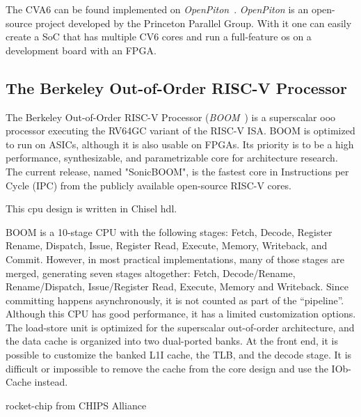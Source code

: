 The CVA6 can be found implemented on \textit{OpenPiton}~\cite{Balkind:2016:OOS:2872362.2872414}. \textit{OpenPiton} is an open-source project developed by the Princeton Parallel Group. With it one can easily create a SoC that has multiple CV6 cores and run a full-feature \acrfull{os} on a development board with an FPGA.

\subsection{The Berkeley Out-of-Order RISC-V Processor}
The Berkeley Out-of-Order RISC-V Processor (\textit{BOOM}~\cite{zhaosonicboom}) is a superscalar \acrfull{ooo} processor executing the RV64GC variant of the RISC-V ISA. BOOM is optimized to run on ASICs, although it is also usable on FPGAs. Its priority is to be a high performance, synthesizable, and parametrizable core for architecture research. The current release, named "SonicBOOM", is the fastest core in Instructions per Cycle (IPC) from the publicly available open-source RISC-V cores.

This \acrshort{cpu} design is written in Chisel \acrfull{hdl}.

BOOM is a 10-stage CPU with the following stages: Fetch, Decode, Register Rename, Dispatch, Issue, Register Read, Execute, Memory, Writeback, and Commit. However, in most practical implementations, many of those stages are merged, generating seven stages altogether: Fetch, Decode/Rename, Rename/Dispatch, Issue/Register Read, Execute, Memory and Writeback. Since committing happens asynchronously, it is not counted as part of the “pipeline”. Although this CPU has good performance, it has a limited customization options. The load-store unit is optimized for the superscalar out-of-order architecture, and the data cache is organized into two dual-ported banks. At the front end, it is possible to customize the banked L1I cache, the TLB, and the decode stage. It is difficult or impossible to remove the cache from the core design and use the IOb-Cache instead.

rocket-chip from CHIPS Alliance 

